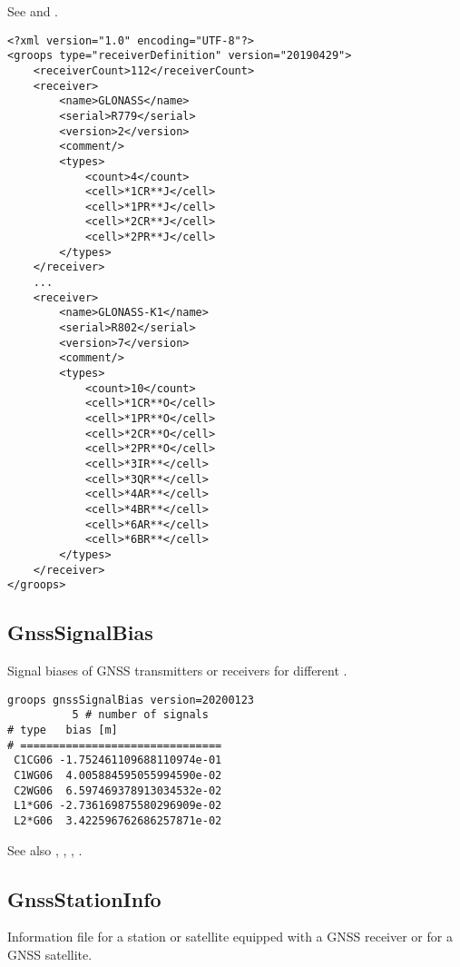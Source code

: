 See  and .

\begin{verbatim}
<?xml version="1.0" encoding="UTF-8"?>
<groops type="receiverDefinition" version="20190429">
    <receiverCount>112</receiverCount>
    <receiver>
        <name>GLONASS</name>
        <serial>R779</serial>
        <version>2</version>
        <comment/>
        <types>
            <count>4</count>
            <cell>*1CR**J</cell>
            <cell>*1PR**J</cell>
            <cell>*2CR**J</cell>
            <cell>*2PR**J</cell>
        </types>
    </receiver>
    ...
    <receiver>
        <name>GLONASS-K1</name>
        <serial>R802</serial>
        <version>7</version>
        <comment/>
        <types>
            <count>10</count>
            <cell>*1CR**O</cell>
            <cell>*1PR**O</cell>
            <cell>*2CR**O</cell>
            <cell>*2PR**O</cell>
            <cell>*3IR**</cell>
            <cell>*3QR**</cell>
            <cell>*4AR**</cell>
            <cell>*4BR**</cell>
            <cell>*6AR**</cell>
            <cell>*6BR**</cell>
        </types>
    </receiver>
</groops>
\end{verbatim}


\subsection{GnssSignalBias}\label{general.fileFormat:gnssSignalBias}
Signal biases of GNSS transmitters or receivers for different .

\begin{verbatim}
groops gnssSignalBias version=20200123
          5 # number of signals
# type   bias [m]
# ===============================
 C1CG06 -1.752461109688110974e-01
 C1WG06  4.005884595055994590e-02
 C2WG06  6.597469378913034532e-02
 L1*G06 -2.736169875580296909e-02
 L2*G06  3.422596762686257871e-02
 \end{verbatim}

See also , , , .


\subsection{GnssStationInfo}\label{general.fileFormat:gnssStationInfo}
Information file for a station or satellite equipped with a GNSS receiver
or for a GNSS satellite.

